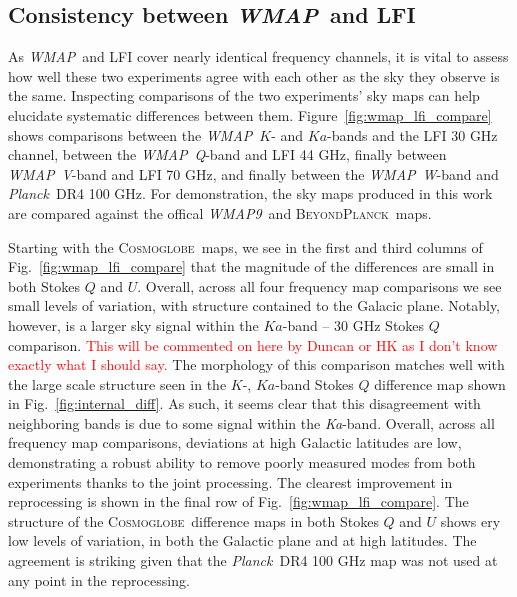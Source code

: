 \documentclass[twocolumn]{../../common/aa}
\def\WMAP{\emph{WMAP}}
\def\WMAPnine{\emph{WMAP9}}
\def\Planck{\emph{Planck}}
\newcommand{\BP}{\textsc{BeyondPlanck}}
\newcommand{\cosmoglobe}{\textsc{Cosmoglobe}}
\newcommand{\Ka}[0]{\textit{Ka}}
\newcommand{\Q}[0]{\textit Q}
\newcommand{\V}[0]{\textit V}
\newcommand{\W}[0]{\textit W}
\begin{document}
\subsection{Consistency between \WMAP\ and LFI}
\label{sec:lfi_consistency}

As \WMAP\ and LFI cover nearly identical frequency channels, it is vital to assess how well these two experiments agree with each other as the sky they observe is the same. Inspecting comparisons of the two experiments' sky maps can help elucidate systematic differences between them. Figure~\ref{fig:wmap_lfi_compare} shows comparisons between the \WMAP\ $K$- and $Ka$-bands and the LFI 30 GHz channel, between the \WMAP\ \Q-band and LFI 44 GHz, finally between \WMAP\ \V-band and LFI 70 GHz, and finally between the \WMAP\ \W-band and \Planck\ DR4 100 GHz. For demonstration, the sky maps produced in this work are compared against the offical \WMAPnine\ and \BP\ maps.

Starting with the \cosmoglobe\ maps, we see in the first and third columns of Fig.~\ref{fig:wmap_lfi_compare} that the magnitude of the differences are small in both Stokes $Q$ and $U$. Overall, across all four frequency map comparisons we see small levels of variation, with structure contained to the Galacic plane. Notably, however, is a larger sky signal within the $Ka$-band -- 30 GHz Stokes $Q$ comparison. \textcolor{red}{This will be commented on here by Duncan or HK as I don't know exactly what I should say.} The morphology of this comparison matches well with the large scale structure seen in the $K$-, $Ka$-band Stokes $Q$ difference map shown in Fig.~\ref{fig:internal_diff}. As such, it seems clear that this disagreement with neighboring bands is due to some signal within the \Ka-band. Overall, across all frequency map comparisons, deviations at high Galactic latitudes are low, demonstrating a robust ability to remove poorly measured modes from both experiments thanks to the joint processing. The clearest improvement in reprocessing is shown in the final row of Fig.~\ref{fig:wmap_lfi_compare}. The structure of the \cosmoglobe\ difference maps in both Stokes $Q$ and $U$ shows ery low levels of variation, in both the Galactic plane and at high latitudes. The agreement is striking given that the \Planck\ DR4 100 GHz map was not used at any point in the reprocessing.
\end{document}
